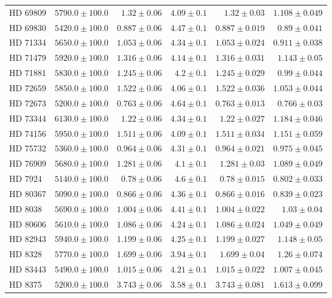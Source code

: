 \begin{longtable*}{lrrrrr}
HD 69809 & $5790.0\pm 100.0$ & $1.32\pm 0.06$ & $4.09\pm 0.1$ & $1.32\pm 0.03$ & $1.108\pm 0.049$ \\ 
HD 69830 & $5420.0\pm 100.0$ & $0.887\pm 0.06$ & $4.47\pm 0.1$ & $0.887\pm 0.019$ & $0.89\pm 0.041$ \\ 
HD 71334 & $5650.0\pm 100.0$ & $1.053\pm 0.06$ & $4.34\pm 0.1$ & $1.053\pm 0.024$ & $0.911\pm 0.038$ \\ 
HD 71479 & $5920.0\pm 100.0$ & $1.316\pm 0.06$ & $4.14\pm 0.1$ & $1.316\pm 0.031$ & $1.143\pm 0.05$ \\ 
HD 71881 & $5830.0\pm 100.0$ & $1.245\pm 0.06$ & $4.2\pm 0.1$ & $1.245\pm 0.029$ & $0.99\pm 0.044$ \\ 
HD 72659 & $5850.0\pm 100.0$ & $1.522\pm 0.06$ & $4.06\pm 0.1$ & $1.522\pm 0.036$ & $1.053\pm 0.044$ \\ 
HD 72673 & $5200.0\pm 100.0$ & $0.763\pm 0.06$ & $4.64\pm 0.1$ & $0.763\pm 0.013$ & $0.766\pm 0.03$ \\ 
HD 73344 & $6130.0\pm 100.0$ & $1.22\pm 0.06$ & $4.34\pm 0.1$ & $1.22\pm 0.027$ & $1.184\pm 0.046$ \\ 
HD 74156 & $5950.0\pm 100.0$ & $1.511\pm 0.06$ & $4.09\pm 0.1$ & $1.511\pm 0.034$ & $1.151\pm 0.059$ \\ 
HD 75732 & $5360.0\pm 100.0$ & $0.964\pm 0.06$ & $4.31\pm 0.1$ & $0.964\pm 0.021$ & $0.975\pm 0.045$ \\ 
HD 76909 & $5680.0\pm 100.0$ & $1.281\pm 0.06$ & $4.1\pm 0.1$ & $1.281\pm 0.03$ & $1.089\pm 0.049$ \\ 
HD 7924 & $5140.0\pm 100.0$ & $0.78\pm 0.06$ & $4.6\pm 0.1$ & $0.78\pm 0.015$ & $0.802\pm 0.033$ \\ 
HD 80367 & $5090.0\pm 100.0$ & $0.866\pm 0.06$ & $4.36\pm 0.1$ & $0.866\pm 0.016$ & $0.839\pm 0.023$ \\ 
HD 8038 & $5690.0\pm 100.0$ & $1.004\pm 0.06$ & $4.41\pm 0.1$ & $1.004\pm 0.022$ & $1.03\pm 0.04$ \\ 
HD 80606 & $5610.0\pm 100.0$ & $1.086\pm 0.06$ & $4.24\pm 0.1$ & $1.086\pm 0.024$ & $1.049\pm 0.049$ \\ 
HD 82943 & $5940.0\pm 100.0$ & $1.199\pm 0.06$ & $4.25\pm 0.1$ & $1.199\pm 0.027$ & $1.148\pm 0.05$ \\ 
HD 8328 & $5770.0\pm 100.0$ & $1.699\pm 0.06$ & $3.94\pm 0.1$ & $1.699\pm 0.04$ & $1.26\pm 0.074$ \\ 
HD 83443 & $5490.0\pm 100.0$ & $1.015\pm 0.06$ & $4.21\pm 0.1$ & $1.015\pm 0.022$ & $1.007\pm 0.045$ \\ 
HD 8375 & $5200.0\pm 100.0$ & $3.743\pm 0.06$ & $3.58\pm 0.1$ & $3.743\pm 0.081$ & $1.613\pm 0.099$ \\ 

\end{longtable*}
